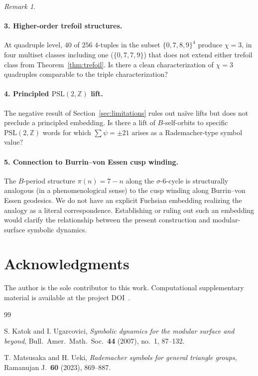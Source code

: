\documentclass[submission,copyright,creativecommons]{eptcs}
\theoremstyle{plain}
\theoremstyle{definition}
\theoremstyle{remark}
\newtheorem{remark}[theorem]{Remark}
\begin{document}
\begin{remark}
\paragraph{3. Higher-order trefoil structures.}
At quadruple level, $40$ of $256$ $4$-tuples in the subset
$\{0, 7, 8, 9\}^4$ produce $\chi = 3$, in four multiset classes including
one ($\{0, 7, 7, 9\}$) that does not extend either trefoil class from
Theorem~\ref{thm:trefoil}. Is there a clean characterization of $\chi = 3$
quadruples comparable to the triple characterization?

\paragraph{4. Principled $\mathrm{PSL}(2, \mathbb{Z})$ lift.}
The negative result of Section~\ref{sec:limitations} rules out na\"ive
lifts but does not preclude a principled embedding. Is there a lift of
$B$-self-orbits to specific $\mathrm{PSL}(2, \mathbb{Z})$ words for which
$\sum \psi = \pm 21$ arises as a Rademacher-type symbol value?

\paragraph{5. Connection to Burrin--von Essen cusp winding.}
The $B$-period structure $\pi(n) = 7 - n$ along the $\sigma$-$6$-cycle is
structurally analogous (in a phenomenological sense) to the cusp winding
along Burrin--von Essen geodesics. We do not have an explicit Fuchsian
embedding realizing the analogy as a literal correspondence. Establishing
or ruling out such an embedding would clarify the relationship between
the present construction and modular-surface symbolic dynamics.

\section*{Acknowledgments}

The author is the sole contributor to this work. Computational supplementary
material is available at the project DOI~\cite{TIG2026}.

\begin{thebibliography}{99}

S. Katok and I. Ugarcovici,
\emph{Symbolic dynamics for the modular surface and beyond},
Bull.\ Amer.\ Math.\ Soc.\ \textbf{44} (2007), no.\ 1, 87--132.

T. Matsusaka and H. Ueki,
\emph{Rademacher symbols for general triangle groups},
Ramanujan J.\ \textbf{60} (2023), 869--887.


\end{thebibliography}
\end{remark}
\end{document}
